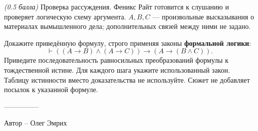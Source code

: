 \question
\textit{(0.5 балла)} Проверка рассуждения. Феникс Райт готовится к слушанию и проверяет логическую схему аргумента. $A,B,C$ --- произвольные высказывания о материалах вымышленного дела; дополнительных связей между ними не задано.

Докажите приведённую формулу, строго применяя законы \textbf{формальной логики}:
\[
\vdash ((A\to B)\land(A\to C))\to(A\to(B\land C)).
\]
Приведите последовательность равносильных преобразований формулы к тождественной истине. Для каждого шага укажите использованный закон. Таблицу истинности вместо доказательства не используйте. Сюжет не добавляет посылок к указанной формуле.

---------------

Автор -- Олег Эмрих
